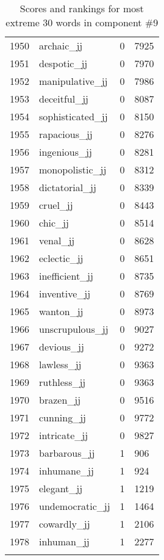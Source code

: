 \begin{longtable}[!htbp]{| rlr@{.}l |}
    1950 & archaic\_jj & 0 & 7925 \\
    1951 & despotic\_jj & 0 & 7970 \\
    1952 & manipulative\_jj & 0 & 7986 \\
    1953 & deceitful\_jj & 0 & 8087 \\
    1954 & sophisticated\_jj & 0 & 8150 \\
    1955 & rapacious\_jj & 0 & 8276 \\
    1956 & ingenious\_jj & 0 & 8281 \\
    1957 & monopolistic\_jj & 0 & 8312 \\
    1958 & dictatorial\_jj & 0 & 8339 \\
    1959 & cruel\_jj & 0 & 8443 \\
    1960 & chic\_jj & 0 & 8514 \\
    1961 & venal\_jj & 0 & 8628 \\
    1962 & eclectic\_jj & 0 & 8651 \\
    1963 & inefficient\_jj & 0 & 8735 \\
    1964 & inventive\_jj & 0 & 8769 \\
    1965 & wanton\_jj & 0 & 8973 \\
    1966 & unscrupulous\_jj & 0 & 9027 \\
    1967 & devious\_jj & 0 & 9272 \\
    1968 & lawless\_jj & 0 & 9363 \\
    1969 & ruthless\_jj & 0 & 9363 \\
    1970 & brazen\_jj & 0 & 9516 \\
    1971 & cunning\_jj & 0 & 9772 \\
    1972 & intricate\_jj & 0 & 9827 \\
    1973 & barbarous\_jj & 1 & 906 \\
    1974 & inhumane\_jj & 1 & 924 \\
    1975 & elegant\_jj & 1 & 1219 \\
    1976 & undemocratic\_jj & 1 & 1464 \\
    1977 & cowardly\_jj & 1 & 2106 \\
    1978 & inhuman\_jj & 1 & 2277 \\
    \hline
    \caption{Scores and rankings for most extreme 30 words in component \#9} \\
\end{longtable}
